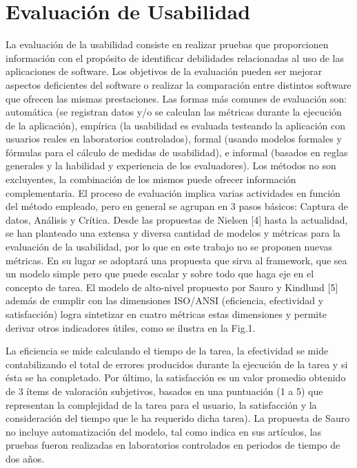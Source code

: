 \section{Evaluación de Usabilidad}
\label{sec:eval_usabilidad}

La evaluación de la usabilidad consiste en realizar pruebas que proporcionen información con el propósito de identificar debilidades relacionadas al uso de las aplicaciones de software. Los objetivos de la evaluación pueden ser mejorar aspectos deficientes del software o realizar la comparación entre distintos software que ofrecen las mismas prestaciones. Las formas más comunes de evaluación son: automática (se registran datos y/o se calculan las métricas durante la ejecución de la aplicación), empírica (la usabilidad es evaluada testeando la aplicación con usuarios reales en laboratorios controlados), formal (usando modelos formales y fórmulas para el cálculo de medidas de usabilidad), e informal (basados en reglas generales y la habilidad y experiencia de los evaluadores). Los métodos no son excluyentes, la combinación de los mismos puede ofrecer información complementaria. El  proceso de evaluación implica varias actividades en función del método empleado, pero en general se agrupan en 3 pasos básicos: Captura de datos, Análisis y Crítica.
Desde las propuestas de Nielsen [4] hasta la actualidad, se han planteado una extensa y diversa cantidad de modelos y métricas para la evaluación de la usabilidad, por lo que en este trabajo no se proponen nuevas métricas. En su lugar se adoptará una propuesta que sirva al framework, que sea un modelo simple pero que puede escalar y sobre todo que haga eje en el concepto de tarea. El modelo de alto-nivel propuesto por Sauro y Kindlund [5] además de cumplir con las dimensiones ISO/ANSI (eficiencia, efectividad y satisfacción) logra sintetizar en cuatro métricas estas dimensiones y permite derivar otros indicadores útiles, como se ilustra en la Fig.1. 


La eficiencia se mide calculando el tiempo de la tarea, la efectividad se mide contabilizando el total de errores producidos durante la ejecución de la tarea y si ésta se ha completado. Por último, la satisfacción es un valor promedio obtenido de 3 ítems de valoración subjetivos, basados en una puntuación (1 a 5) que representan la complejidad de la tarea para el usuario, la satisfacción y la consideración del tiempo que le ha requerido dicha tarea). 
La propuesta de Sauro no incluye automatización del modelo, tal como indica en sus artículos, las pruebas fueron realizadas en laboratorios controlados en periodos de tiempo de dos años. 
